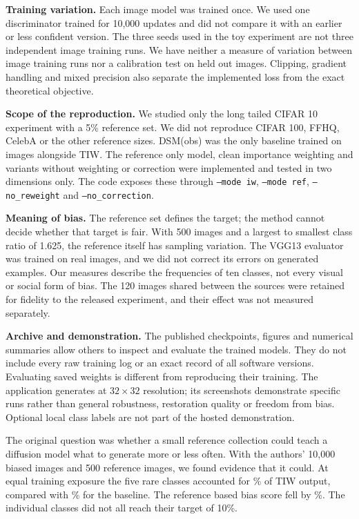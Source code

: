 \documentclass[11pt,a4paper]{article}
\makeatletter
\renewcommand\section{\@startsection{section}{1}{\z@}{2ex plus .3ex}{.7ex}{\normalfont\LARGE\bfseries\color{Ink}\raggedright}}
\newcommand{\lead}[1]{\textbf{\color{Ink}#1}\enspace}
\makeatother
\begin{document}
\lead{Training variation.} Each image model was trained once. We used one discriminator trained for 10,000 updates and did not compare it with an earlier or less confident version. The three seeds used in the toy experiment are not three independent image training runs. We have neither a measure of variation between image training runs nor a calibration test on held out images. Clipping, gradient handling and mixed precision also separate the implemented loss from the exact theoretical objective.

\lead{Scope of the reproduction.} We studied only the long tailed CIFAR 10 experiment with a 5\% reference set. We did not reproduce CIFAR 100, FFHQ, CelebA or the other reference sizes. DSM(obs) was the only baseline trained on images alongside TIW. The reference only model, clean importance weighting and variants without weighting or correction were implemented and tested in two dimensions only. The code exposes these through \texttt{--mode iw}, \texttt{--mode ref}, \texttt{--no\_reweight} and \texttt{--no\_correction}.

\lead{Meaning of bias.} The reference set defines the target; the method cannot decide whether that target is fair. With 500 images and a largest to smallest class ratio of 1.625, the reference itself has sampling variation. The VGG13 evaluator was trained on real images, and we did not correct its errors on generated examples. Our measures describe the frequencies of ten classes, not every visual or social form of bias. The 120 images shared between the sources were retained for fidelity to the released experiment, and their effect was not measured separately.

\lead{Archive and demonstration.} The published checkpoints, figures and numerical summaries allow others to inspect and evaluate the trained models. They do not include every raw training log or an exact record of all software versions. Evaluating saved weights is different from reproducing their training. The application generates at $32\times32$ resolution; its screenshots demonstrate specific runs rather than general robustness, restoration quality or freedom from bias. Optional local class labels are not part of the hosted demonstration.

\section{Conclusion}\label{sec:conclusion}
The original question was whether a small reference collection could teach a diffusion model what to generate more or less often. With the authors' 10,000 biased images and 500 reference images, we found evidence that it could. At equal training exposure the five rare classes accounted for \resTailtiw\% of TIW output, compared with \resTailobs\% for the baseline. The reference based bias score fell by \resBiasRed\%. The individual classes did not all reach their target of 10\%.
\end{document}
